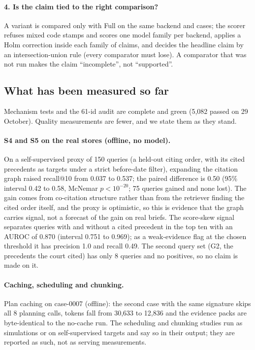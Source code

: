 \paragraph{4. Is the claim tied to the right comparison?} A variant is compared only with Full on the same backend and cases; the scorer refuses mixed code stamps and scores one model family per backend, applies a Holm correction inside each family of claims, and decides the headline claim by an intersection-union rule (every comparator must lose). A comparator that was not run makes the claim ``incomplete'', not ``supported''.

\subsection{What has been measured so far}

Mechanism tests and the 61-id audit are complete and green (5,082 passed on 29 October). Quality measurements are fewer, and we state them as they stand.

\paragraph{S4 and S5 on the real stores (offline, no model).} On a self-supervised proxy of 150 queries (a held-out citing order, with its cited precedents as targets under a strict before-date filter), expanding the citation graph raised recall@10 from 0.037 to 0.537; the paired difference is 0.50 (95\% interval 0.42 to 0.58, McNemar $p<10^{-20}$; 75 queries gained and none lost). The gain comes from co-citation structure rather than from the retriever finding the cited order itself, and the proxy is optimistic, so this is evidence that the graph carries signal, not a forecast of the gain on real briefs. The score-skew signal separates queries with and without a cited precedent in the top ten with an AUROC of 0.870 (interval 0.751 to 0.969); as a weak-evidence flag at the chosen threshold it has precision 1.0 and recall 0.49. The second query set (G2, the precedents the court cited) has only 8 queries and no positives, so no claim is made on it.

\paragraph{Caching, scheduling and chunking.} Plan caching on case-0007 (offline): the second case with the same signature skips all 8 planning calls, tokens fall from 30,633 to 12,836 and the evidence packs are byte-identical to the no-cache run. The scheduling and chunking studies run as simulations or on self-supervised targets and say so in their output; they are reported as such, not as serving measurements.

